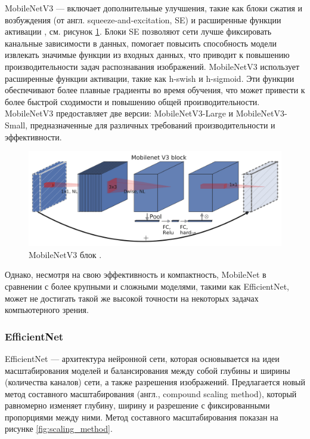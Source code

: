 \documentclass[a4paper,12pt]{extarticle}
\begin{document}
MobileNetV3 — включает дополнительные улучшения, такие как блоки сжатия и возбуждения (от англ. squeeze-and-excitation, SE) и расширенные функции активации \cite{mobilenetv3},  см. рисунок  \ref{fig:mobilenetv3}. Блоки SE позволяют сети лучше фиксировать канальные зависимости в данных, помогает повысить способность модели извлекать значимые функции из входных данных, что приводит к повышению производительности задач распознавания изображений. MobileNetV3 использует расширенные функции активации, такие как h-swish и h-sigmoid. Эти функции обеспечивают более плавные градиенты во время обучения, что может привести к более быстрой сходимости и повышению общей производительности. MobileNetV3 предоставляет две версии: MobileNetV3-Large и MobileNetV3-Small, предназначенные для различных требований производительности и эффективности.

\begin{figure}[ht]
	\centering
	\includegraphics[scale=0.2]{mobilenet-v3-block.png}
	\caption{MobileNetV3 блок \cite{mobilenetv3}.}
	\label{fig:mobilenetv3}
\end{figure}

Однако, несмотря на свою эффективность и компактность, MobileNet в сравнении с более крупными и сложными моделями, такими как EfficientNet, может не достигать такой же высокой точности на некоторых задачах компьютерного зрения.

\subsubsection{EfficientNet}

EfficientNet — архитектура нейронной сети, которая основывается на идеи масштабирования моделей и балансирования между собой глубины и ширины (количества каналов) сети, а также разрешения изображений\cite{efficientnet}. Предлагается новый метод составного масштабирования (англ., compound scaling method), который равномерно изменяет глубину, ширину и разрешение с фиксированными пропорциями между ними. Метод составного масштабирования показан на рисунке \ref{fig:scaling_method}.
\end{document}
